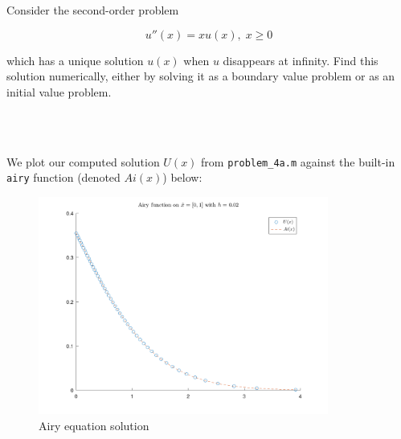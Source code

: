 Consider the second-order problem

$$
u''(x) = x u(x),\; x \ge 0
$$

which has a unique solution $u(x)$ when $u$ disappears at infinity. Find this solution numerically, either by solving
it as a boundary value problem or as an initial value problem.

\begin{solution}\ \\\\
    \newpage
    \hfill\vfill
    \pagebreak

    We plot our computed solution $U(x)$ from \texttt{problem\_4a.m} against the built-in \texttt{airy} function
    (denoted $Ai(x)$) below:

    \begin{figure}[h]
        \centering
        \includegraphics[width=0.85\textwidth]{problem_4a_airy_function.png}
        \caption{Airy equation solution}
    \end{figure}
    \ \\
\end{solution}